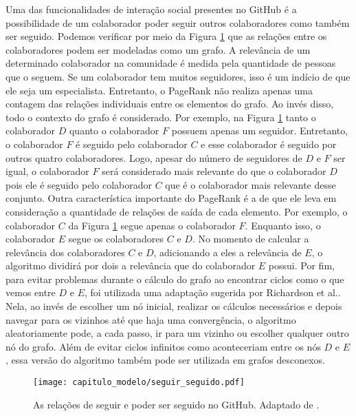 Uma das funcionalidades de interação social presentes no GitHub é  a possibilidade de um colaborador poder seguir outros colaboradores como também ser seguido.  Podemos verificar por meio da Figura \ref{fig:cap_modelo_seguir_seguido} que as relações entre os colaboradores podem ser modeladas como um grafo. A relevância de um determinado colaborador na comunidade é medida pela quantidade de pessoas que o seguem. Se um colaborador tem muitos seguidores, isso é um indício de que ele seja um especialista. Entretanto, o PageRank não realiza apenas uma contagem das relações individuais entre os elementos do grafo. Ao invés disso, todo o contexto do grafo é considerado. Por exemplo, na Figura \ref{fig:cap_modelo_seguir_seguido} tanto o colaborador $D$ quanto o colaborador $F$ possuem apenas um seguidor. Entretanto, o colaborador $F$ é seguido pelo colaborador $C$ e esse colaborador é seguido por outros quatro colaboradores. Logo, apesar do número de seguidores de $D$ e $F$ ser igual,  o colaborador $F$ será considerado mais relevante do que o colaborador $D$ pois ele é seguido pelo colaborador  $C$ que é o colaborador mais relevante desse conjunto. Outra característica importante do PageRank é a de que ele leva em consideração a quantidade de relações de saída de cada elemento. Por exemplo, o colaborador $C$ da Figura \ref{fig:cap_modelo_seguir_seguido} segue apenas o colaborador $F$. Enquanto isso, o colaborador $E$ segue os colaboradores $C$ e $D$. No momento de calcular a relevância dos colaboradores $C$ e $D$, adicionando a eles a relevância de $E$,  o algoritmo dividirá por dois a relevância que do colaborador $E$ possui. Por fim, para evitar problemas durante o cálculo do grafo ao encontrar ciclos como o que vemos entre $D$ e $E$,  foi utilizada uma adaptação sugerida por Richardson et al.\cite{richardson2002intelligent}. Nela, ao invés de escolher um nó inicial, realizar os cálculos necessários e depois navegar para os vizinhos até que haja uma convergência, o algoritmo aleatoriamente pode, a cada passo, ir para um vizinho ou escolher qualquer outro nó do grafo. Além de evitar ciclos infinitos como aconteceriam entre os nós $D$ e $E$, essa versão do algoritmo também pode ser utilizada em grafos desconexos. 

  \begin{figure}[H]
  \centering
  \texttt{[image: capitulo\_modelo/seguir\_seguido.pdf]} 
  \caption{As relações de seguir e poder ser seguido no GitHub. Adaptado de \cite{mo2015geminer}.}
  \label{fig:cap_modelo_seguir_seguido} 
\end{figure}

